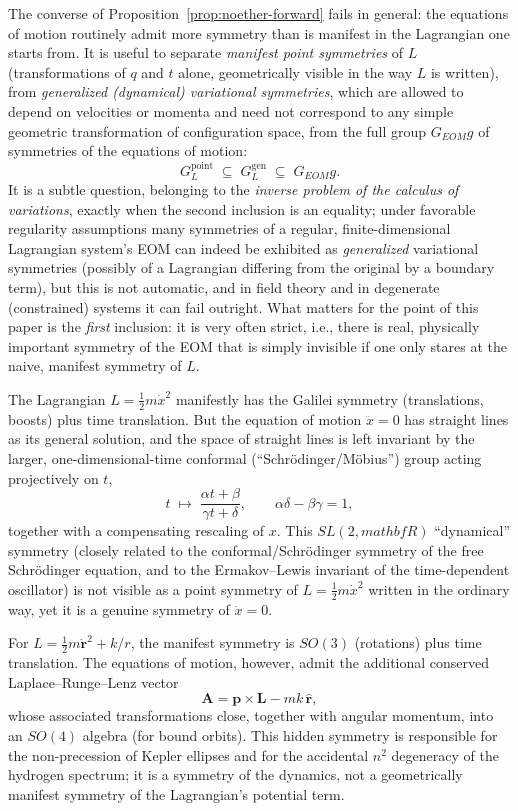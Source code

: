 The converse of Proposition~\ref{prop:noether-forward} fails in general: the
equations of motion routinely admit more symmetry than is manifest in the
Lagrangian one starts from. It is useful to separate \emph{manifest point
symmetries} of $L$ (transformations of $q$ and $t$ alone, geometrically visible
in the way $L$ is written), from \emph{generalized (dynamical) variational
symmetries}, which are allowed to depend on velocities or momenta and need not
correspond to any simple geometric transformation of configuration space, from
the full group $G_{EOM}g$ of symmetries of the equations of motion:
\[
G_L^{\text{point}} \;\subseteq\; G_L^{\text{gen}} \;\subseteq\; G_{EOM}g .
\]
It is a subtle question, belonging to the \emph{inverse problem of the calculus
of variations}, exactly when the second inclusion is an equality; under
favorable regularity assumptions many symmetries of a regular,
finite-dimensional Lagrangian system's EOM can indeed be exhibited as
\emph{generalized} variational symmetries (possibly of a Lagrangian differing
from the original by a boundary term), but this is not automatic, and in field
theory and in degenerate (constrained) systems it can fail outright. What
matters for the point of this paper is the \emph{first} inclusion: it is very
often strict, i.e., there is real, physically important symmetry of the EOM
that is simply invisible if one only stares at the naive, manifest symmetry of
$L$.

\begin{example}
The Lagrangian $L=\tfrac12 m\dot x^2$ manifestly has the Galilei symmetry
    (translations, boosts) plus time translation. But the equation of motion
    $\ddot x=0$ has straight lines as its general solution, and the space of
    straight lines is left invariant by the larger, one-dimensional-time
    conformal (``Schr\"odinger/M\"obius'') group acting projectively on $t$,
\[
t \;\longmapsto\; \frac{\alpha t+\beta}{\gamma t+\delta}, \qquad \alpha\delta-\beta\gamma=1,
\]
together with a compensating rescaling of $x$. This $SL(2,mathbf R)$ ``dynamical''
    symmetry (closely related to the conformal/Schr\"odinger symmetry of the
    free Schr\"odinger equation, and to the Ermakov--Lewis invariant of the
    time-dependent oscillator) is not visible as a point symmetry of
    $L=\tfrac12 m\dot x^2$ written in the ordinary way, yet it is a genuine
    symmetry of $\ddot x=0$.
\end{example}

\begin{example}
For $L = \tfrac12 m\dot{\bm r}^2 + k/r$, the manifest symmetry is $SO(3)$ (rotations) plus time translation. The equations of motion, however, admit the additional conserved Laplace--Runge--Lenz vector
\[
\bm A = \bm p \times \bm L - mk\,\hat{\bm r},
\]
whose associated transformations close, together with angular momentum, into an
    $SO(4)$ algebra (for bound orbits). This hidden symmetry is responsible for
    the non-precession of Kepler ellipses and for the accidental $n^2$
    degeneracy of the hydrogen spectrum; it is a symmetry of the dynamics, not
    a geometrically manifest symmetry of the Lagrangian's potential term.
\end{example}

